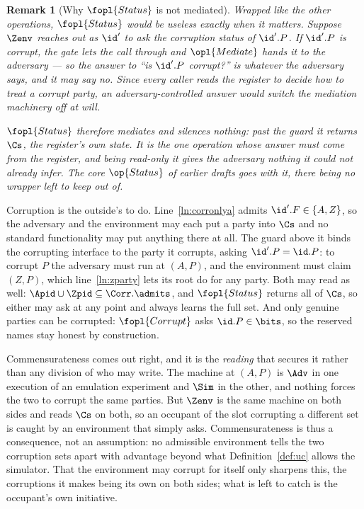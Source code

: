 \documentclass[10pt,oneside,openany]{book}
\theoremstyle{accentdef}
\newtheorem{remark}[definition]{Remark}
\theoremstyle{accentplain}
\begin{document}
\begin{remark}[Why $\fopl{Status}$ is not mediated]\label{rem:statusmed}
Wrapped like the other operations, $\fopl{Status}$ would be useless exactly when it matters.
Suppose $\Zenv$ reaches out as $\id'$ to ask the corruption status of $\id'.P$. If $\id'.P$ is
corrupt, the gate lets the call through and $\opl{Mediate}$ hands it to the adversary --- so the
answer to ``is $\id'.P$ corrupt?'' is whatever the adversary says, and it may say no. Since every
caller reads the register to decide how to treat a corrupt party, an adversary-controlled answer
would switch the mediation machinery off at will.

$\fopl{Status}$ therefore mediates and silences nothing: past the guard it returns $\Cs$, the
register's own state. It is the one operation whose answer must come from the register, and
being read-only it gives the adversary nothing it could not already infer. The core
$\op{Status}$ of earlier drafts goes with it, there being no wrapper left to keep out of.
\end{remark}

Corruption is the outside's to do. Line~\ref{ln:corronlya} admits $\id'.F \in \{A,Z\}$, so the
adversary and the environment may each put a party into $\Cs$ and no standard functionality may
put anything there at all. The guard above it binds the corrupting interface to the party it
corrupts, asking $\id'.P = \id.P$: to corrupt $P$ the adversary must run at $(A,P)$, and the
environment must claim $(Z,P)$, which line~\ref{ln:zparty} lets its root do for any party.
Both may read as well: $\Apid \cup \Zpid \subseteq \Corr.\admits$, and $\fopl{Status}$ returns all of
$\Cs$, so either may ask at any point and always learns the full set. And only genuine
parties can be corrupted: $\fopl{Corrupt}$ asks $\id.P \in \bits$, so the reserved names stay
honest by construction.

Commensurateness comes out right, and it is the \emph{reading} that secures it rather than any
division of who may write. The machine at $(A,P)$ is $\Adv$ in
one execution of an emulation experiment and $\Sim$ in the other, and nothing forces the two to
corrupt the same parties. But $\Zenv$ is the same machine on both sides and reads $\Cs$ on both,
so an occupant of the slot corrupting a different set is caught by an environment that simply asks.
Commensurateness is thus a consequence, not an assumption: no admissible environment tells the
two corruption sets apart with advantage beyond what Definition~\ref{def:uc} allows the
simulator. That the environment may corrupt for itself only sharpens this, the corruptions it makes
being its own on both sides; what is left to catch is the occupant's own initiative.
\end{document}
